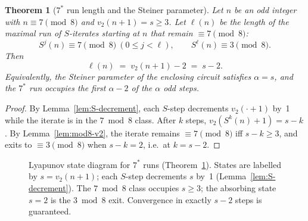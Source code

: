 \documentclass[11pt,a4paper]{article}
\newtheorem{theorem}{Theorem}[section]
\theoremstyle{remark}
\theoremstyle{plain}
\begin{document}
\begin{theorem}[$7^*$ run length and the Steiner parameter]
\label{thm:7chain}
Let $n$ be an odd integer with $n \equiv 7 \pmod{8}$ and $v_2(n+1) = s \ge 3$.
Let $\ell(n)$ be the length of the maximal run of $S$-iterates starting at $n$
that remain $\equiv 7 \pmod{8}$:
\[
  S^j(n) \equiv 7 \pmod{8}\ (0 \le j < \ell), \qquad S^\ell(n) \equiv 3 \pmod{8}.
\]
Then
\[
  \ell(n) \;=\; v_2(n+1) - 2 \;=\; s - 2.
\]
Equivalently, the Steiner parameter of the enclosing circuit satisfies $\alpha = s$,
and the $7^*$ run occupies the first $\alpha - 2$ of the $\alpha$ odd steps.
\end{theorem}
\begin{proof}
By Lemma~\ref{lem:S-decrement}, each $S$-step decrements $v_2(\cdot+1)$ by~1
while the iterate is in the $7 \bmod 8$ class.
After $k$ steps, $v_2(S^k(n)+1) = s-k$.
By Lemma~\ref{lem:mod8-v2}, the iterate remains $\equiv 7 \pmod 8$ iff $s-k \ge 3$,
and exits to $\equiv 3 \pmod 8$ when $s-k = 2$, i.e.\ at $k = s-2$.
\end{proof}

\begin{figure}[h]
\centering
{}
\caption{Lyapunov state diagram for $7^*$ runs (Theorem~\ref{thm:7chain}).
States are labelled by $s = v_2(n+1)$; each $S$-step decrements $s$ by~1
(Lemma~\ref{lem:S-decrement}).
The $7 \bmod 8$ class occupies $s \ge 3$; the absorbing state $s=2$ is the
$3 \bmod 8$ exit. Convergence in exactly $s-2$ steps is guaranteed.}
\label{fig:7mod8-lyapunov}
\end{figure}
\end{document}
